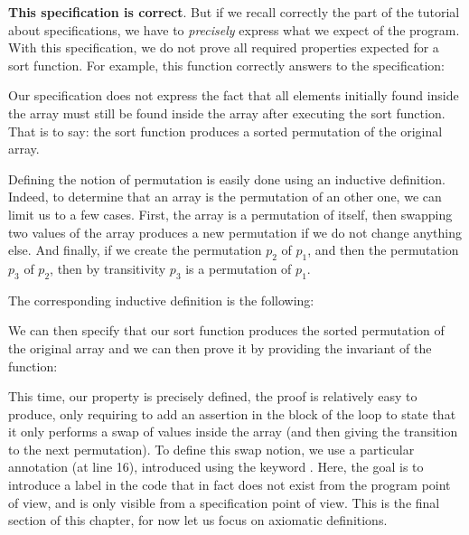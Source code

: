 

\textbf{This specification is correct}. But if we recall correctly the part of the
tutorial about specifications, we have to \emph{precisely} express what we expect
of the program. With this specification, we do not prove all required properties
expected for a sort function. For example, this function correctly answers to
the specification:




Our specification does not express the fact that all elements initially found
inside the array must still be found inside the array after executing the
sort function. That is to say: the sort function produces a sorted permutation
of the original array.

Defining the notion of permutation is easily done using an inductive definition.
Indeed, to determine that an array is the permutation of an other one, we can
limit us to a few cases. First, the array is a permutation of itself, then
swapping two values of the array produces a new permutation if we do not change
anything else. And finally, if we create the permutation $p_2$ of $p_1$, and then
the permutation $p_3$ of $p_2$, then by transitivity $p_3$ is a permutation of
$p_1$.

The corresponding inductive definition is the following:




We can then specify that our sort function produces the sorted permutation of
the original array and we can then prove it by providing the invariant of the
function:





This time, our property is precisely defined, the proof is relatively easy to
produce, only requiring to add an assertion in the block of the loop to state
that it only performs a swap of values inside the array (and then giving
the transition to the next permutation). To define this swap notion, we use
a particular annotation (at line 16), introduced using the keyword
. Here, the goal is to introduce a label in the code that in
fact does not exist from the program point of view, and is only visible from
a specification point of view. This is the final section of this chapter, for
now let us focus on axiomatic definitions.



